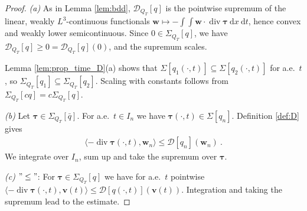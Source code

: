 \documentclass{article}
\theoremstyle{definition}
\newcommand{\bfv}{\boldsymbol{v}}
\newcommand{\bfw}{\boldsymbol{w}}
\newcommand{\bftau}{\boldsymbol{\tau}}
\newcommand{\D}{\mathcal{D}}
\newcommand{\dd}{\:\mathrm{d}}
\renewcommand\div{\operatorname{\mathrm{div}}}
\begin{document}
\begin{proof}
    \textit{(a)} As in Lemma \ref{lem:bdd}, $\D_{Q_T}[q]$ is the pointwise supremum of the linear, weakly $L^{3}$-continuous
    functionals $\bfw \mapsto - \int\int \bfw \cdot\div\bftau \dd x \dd t$, hence convex and weakly lower semicontinuous.
    Since $0 \in \Sigma_{Q_T}[q]$, we have $\D_{Q_T}[q]\geq 0 = \D_{Q_T}[q](0)$, and the supremum scales.

    Lemma \ref{lem:prop_time_D}(a) shows that $\Sigma[q_1(\cdot,t)] \subseteq \Sigma[q_2(\cdot,t)]$ for a.e.\ $t$,
    so $\Sigma_{Q_T}[q_1] \subseteq \Sigma_{Q_T}[q_2]$. Scaling with constants follows from $\Sigma_{Q_T}[cq] =c\Sigma_{Q_T}[q]$.

    \textit{(b)} Let $\bftau \in \Sigma_{Q_T}[\bar q]$. For a.e.\ $t\in I_n$ we have
    $\bftau(\cdot,t) \in \Sigma[q_n]$. Definition \ref{def:D} gives
    \begin{align*}
        \langle -\div\bftau(\cdot, t), \bfw_n\rangle \leq \D [q_n](\bfw_n) \ .
    \end{align*}
    We integrate over $I_n$, sum up and take the supremum over $\bftau$.

    \textit{(c)}  $"\leq"$: For $\bftau \in \Sigma_{Q_T}[q]$ we have for a.e.\ $t$ pointwise $\langle-\div \bftau(\cdot,t),
    \bfv(t)\rangle \leq \D[q(\cdot,t)](\bfv(t))$. Integration and taking the supremum lead to the estimate.


\end{proof}
\end{document}
